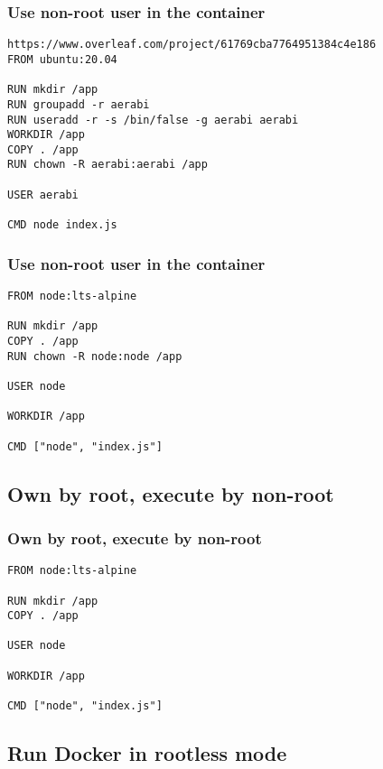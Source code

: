 \documentclass[10pt, compress]{beamer}
\begin{document}
\begin{frame}[fragile]
  \frametitle{Use non-root user in the container}
  
  \begin{verbatim}https://www.overleaf.com/project/61769cba7764951384c4e186
FROM ubuntu:20.04

RUN mkdir /app
RUN groupadd -r aerabi
RUN useradd -r -s /bin/false -g aerabi aerabi
WORKDIR /app
COPY . /app
RUN chown -R aerabi:aerabi /app

USER aerabi

CMD node index.js
  \end{verbatim}
\end{frame}

\begin{frame}[fragile]
  \frametitle{Use non-root user in the container}
  
  \begin{verbatim}
FROM node:lts-alpine

RUN mkdir /app
COPY . /app
RUN chown -R node:node /app

USER node

WORKDIR /app

CMD ["node", "index.js"]
  \end{verbatim}

\end{frame}

\subsection{Own by root, execute by non-root}

\begin{frame}[fragile]
  \frametitle{Own by root, execute by non-root}
  
  \begin{verbatim}
FROM node:lts-alpine

RUN mkdir /app
COPY . /app

USER node

WORKDIR /app

CMD ["node", "index.js"]
  \end{verbatim}

\end{frame}

\subsection{Run Docker in rootless mode}
\end{document}
